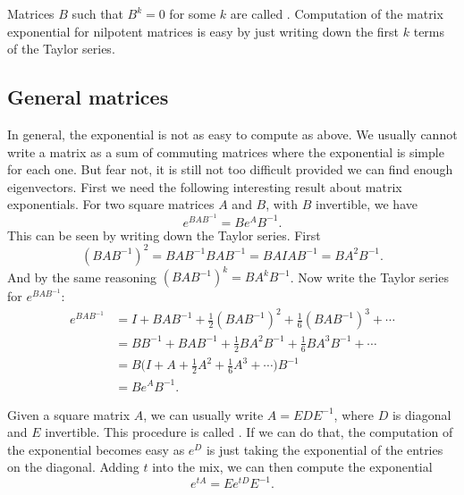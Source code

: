 \documentclass{ximera}
\begin{document}
Matrices $B$ such that $B^k = 0$ for some $k$ are called \emph{}.  Computation of the matrix exponential for nilpotent matrices is easy by just writing down the first $k$ terms of the Taylor series.

\subsection{General matrices}

In general, the exponential is not as easy to compute as above.  We usually cannot write a matrix as a sum of commuting matrices where the exponential is simple for each one.  But fear not, it is still not too difficult provided we can find enough eigenvectors.  First we need the following interesting result about matrix exponentials.  For two square matrices $A$ and $B$, with $B$ invertible, we have
\begin{equation*}
    e^{BAB^{-1}} = B e^A B^{-1} .
\end{equation*}
This can be seen by writing down the Taylor series.  First 
\begin{equation*}
    {(BAB^{-1})}^2 = BAB^{-1} BAB^{-1} = BAIAB^{-1} = BA^2B^{-1} .
\end{equation*}
And by the same reasoning ${(BAB^{-1})}^k = B A^k B^{-1}$.  Now write the Taylor series for $e^{BAB^{-1}}$:
\begin{equation*}
    \begin{split}
        e^{BAB^{-1}} & = I + {BAB^{-1}} + \frac{1}{2} {(BAB^{-1})}^2 + \frac{1}{6} {(BAB^{-1})}^3 + \cdots \\
        & = BB^{-1} + {BAB^{-1}} + \frac{1}{2} BA^2B^{-1} + \frac{1}{6} BA^3B^{-1} + \cdots \\
        & = B \bigl( I + A + \frac{1}{2} A^2 + \frac{1}{6} A^3 + \cdots \bigr) B^{-1} \\
        & = B e^A B^{-1} . 
    \end{split}
\end{equation*}

Given a square matrix $A$, we can usually write $A = E D E^{-1}$, where $D$ is diagonal and $E$ invertible. This procedure is called \emph{}. If we can do that, the computation  of the 
exponential becomes easy as $e^D$ is just taking the exponential of the entries on the diagonal.  Adding $t$ into the mix, we can then compute the exponential
\begin{equation*}
    e^{tA} = E e^{tD} E^{-1} .
\end{equation*}
\end{document}
